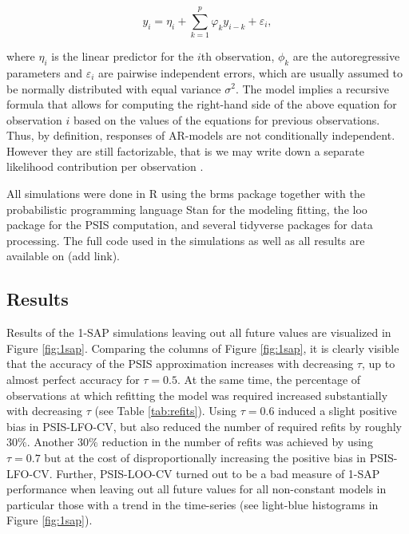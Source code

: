 \documentclass[american,]{article}
\begin{document}
\begin{equation}
y_i = \eta_i + \sum_{k = 1}^p \varphi_k y_{i - k} + \varepsilon_i,
\end{equation}

where \(\eta_i\) is the linear predictor for the \(i\)th observation, \(\phi_k\) are
the autoregressive parameters and \(\varepsilon_i\) are pairwise independent
errors, which are usually assumed to be normally distributed with equal variance
\(\sigma^2\). The model implies a recursive formula that allows for computing the
right-hand side of the above equation for observation \(i\) based on the values of
the equations for previous observations. Thus, by definition, responses of
AR-models are not conditionally independent. However they are still
factorizable, that is we may write down a separate likelihood contribution per
observation \citep[see][ for more discussion on
factorizability of statistical models]{buerkner:non-factorizable}.

All simulations were done in R \citep{R2018} using the brms package \citep{brms1, brms2} together with the probabilistic programming language Stan
\citep{carpenter2017} for the modeling fitting, the loo package \citep{vehtari2017loo} for
the PSIS computation, and several tidyverse packages \citep{tidyverse} for data
processing. The full code used in the simulations as well as all results are
available on (add link).

\hypertarget{sim_results}{%
\subsection{Results}\label{sim_results}}

Results of the 1-SAP simulations leaving out all future values are visualized
in Figure \ref{fig:1sap}. Comparing the columns of Figure \ref{fig:1sap}, it
is clearly visible that the accuracy of the PSIS approximation increases with
decreasing \(\tau\), up to almost perfect accuracy for \(\tau = 0.5\). At the same
time, the percentage of observations at which refitting the model was required
increased substantially with decreasing \(\tau\) (see Table
\ref{tab:refits}). Using \(\tau = 0.6\) induced a slight positive
bias in PSIS-LFO-CV, but also reduced the number of required refits by roughly
\(30\%\). Another \(30\%\) reduction in the number of refits was achieved by
using \(\tau = 0.7\) but at the cost of disproportionally increasing the
positive bias in PSIS-LFO-CV. Further, PSIS-LOO-CV turned out to be a bad
measure of 1-SAP performance when leaving out all future values for all
non-constant models in particular those with a trend in the time-series (see
light-blue histograms in Figure \ref{fig:1sap}).
\end{document}
